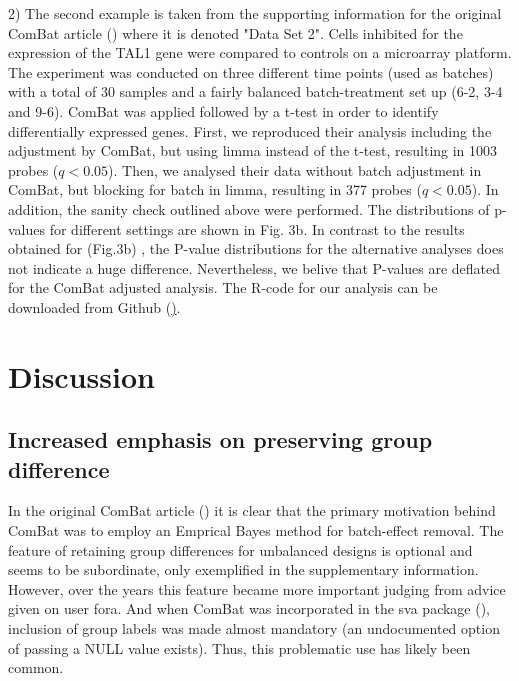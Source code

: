 \documentclass{bio}
\begin{document}

2) The second example is taken from the supporting information for the original ComBat article (\citealp{Johnson2007}) where it is denoted "Data Set 2". Cells inhibited for the expression of the TAL1 gene were compared to controls on a microarray platform. The experiment was conducted on three different time points (used as batches) with a total of 30 samples and a fairly balanced batch-treatment set up (6-2, 3-4 and 9-6). ComBat was applied followed by a t-test in order to identify differentially expressed genes. First, we reproduced their analysis including the adjustment by ComBat, but using limma instead of the t-test, resulting in 1003 probes ($q<0.05$).  Then, we analysed their data without batch adjustment in ComBat, but blocking for batch in limma, resulting in 377 probes ($q<0.05$). In addition, the sanity check outlined above were performed. The distributions of p-values for different settings are shown in Fig. 3b. In contrast to the results obtained for \citealp{Towfic2014} (Fig.3b) , the P-value distributions for the alternative analyses  does not indicate a huge difference. Nevertheless, we belive that  P-values are deflated for the ComBat adjusted analysis. The R-code for our analysis can be downloaded from Github (\href{https://github.com/ous-uio-bioinfo-core/batch-adjust-warning-figures.git}).



\section{Discussion}

\subsection{Increased emphasis on preserving group difference}

In the original ComBat article (\citealp{Johnson2007}) it is clear that the primary motivation behind ComBat was to employ an Emprical Bayes method for batch-effect removal. The feature of retaining group differences for unbalanced designs is optional and seems to be subordinate, only exemplified in the supplementary information. However, over the years this feature became more important judging from advice given on user fora. And when ComBat was incorporated in the sva package (\citealp{Leek2012}), inclusion of group labels was made almost mandatory (an undocumented option of passing a NULL value exists). Thus, this problematic use has likely been common.
\end{document}
